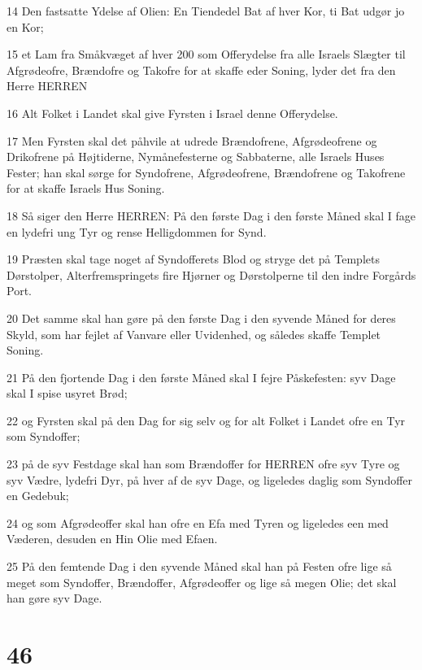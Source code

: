 \par 14 Den fastsatte Ydelse af Olien: En Tiendedel Bat af hver Kor, ti Bat udgør jo en Kor;
\par 15 et Lam fra Småkvæget af hver 200 som Offerydelse fra alle Israels Slægter til Afgrødeofre, Brændofre og Takofre for at skaffe eder Soning, lyder det fra den Herre HERREN
\par 16 Alt Folket i Landet skal give Fyrsten i Israel denne Offerydelse.
\par 17 Men Fyrsten skal det påhvile at udrede Brændofrene, Afgrødeofrene og Drikofrene på Højtiderne, Nymånefesterne og Sabbaterne, alle Israels Huses Fester; han skal sørge for Syndofrene, Afgrødeofrene, Brændofrene og Takofrene for at skaffe Israels Hus Soning.
\par 18 Så siger den Herre HERREN: På den første Dag i den første Måned skal I fage en lydefri ung Tyr og rense Helligdommen for Synd.
\par 19 Præsten skal tage noget af Syndofferets Blod og stryge det på Templets Dørstolper, Alterfremspringets fire Hjørner og Dørstolperne til den indre Forgårds Port.
\par 20 Det samme skal han gøre på den første Dag i den syvende Måned for deres Skyld, som har fejlet af Vanvare eller Uvidenhed, og således skaffe Templet Soning.
\par 21 På den fjortende Dag i den første Måned skal I fejre Påskefesten: syv Dage skal I spise usyret Brød;
\par 22 og Fyrsten skal på den Dag for sig selv og for alt Folket i Landet ofre en Tyr som Syndoffer;
\par 23 på de syv Festdage skal han som Brændoffer for HERREN ofre syv Tyre og syv Vædre, lydefri Dyr, på hver af de syv Dage, og ligeledes daglig som Syndoffer en Gedebuk;
\par 24 og som Afgrødeoffer skal han ofre en Efa med Tyren og ligeledes een med Væderen, desuden en Hin Olie med Efaen.
\par 25 På den femtende Dag i den syvende Måned skal han på Festen ofre lige så meget som Syndoffer, Brændoffer, Afgrødeoffer og lige så megen Olie; det skal han gøre syv Dage.

\chapter{46}

